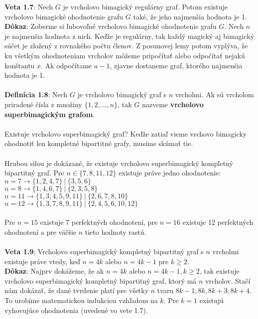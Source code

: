 \documentclass[12pt]{article}
\begin{document}
\textbf{Veta 1.7}: Nech $G$ je vrcholovo bimagický regulárny graf. Potom existuje vrcholovo bimagické ohodnotenie grafu $G$ také, že jeho najmenšia hodnota je 1. \\

\textbf{Dôkaz}: Zoberme si ľubovoľné vrcholovo bimagické ohodnotenie grafu $G$. Nech $n$ je najmenšia hodnota z nich. Keďže je regulárny, tak každý magický aj bimagický súčet je zložený z rovnakého počtu členov. Z posunovej lemy potom vyplýva, že ku všetkým ohodnoteniam vrcholov môžeme pripočítať alebo odpočítať nejakú konštantu $x$. Ak odpočítame $a-1$, zjavne dostaneme graf, ktorého najmenšia hodnota je 1. \\\\

\textbf{Definícia 1.8}: Nech $G$ je vrcholovo bimagický graf s $n$ vrcholmi. Ak sú vrcholom priradené čísla z množiny $\{1, 2, ... , n\}$, tak $G$ nazveme \textbf{ vrcholovo superbimagickým grafom}. \\\\

Existuje vrcholovo superbimagický graf? Keďže zatiaľ vieme vrchovo bimagicky ohodnotiť len kompletné bipartitné grafy, musíme skúmať tie. \\\\

Hrubou silou je dokázané, že existuje vrcholovo superbimagický kompletný bipartitný graf. Pre $n \in \{7, 8, 11, 12\}$ existuje práve jedno ohodnotenie: \\
$n = 7 \rightarrow \{1, 2, 4, 7\} ~|~ \{3, 5, 6\}$ \\
$n = 8 \rightarrow \{1, 4, 6, 7\} ~|~ \{2, 3, 5, 8\}$ \\
$n = 11 \rightarrow \{1, 3, 4, 5, 9, 11\} ~|~ \{2, 6, 7, 8, 10\}$ \\
$n = 12 \rightarrow \{1, 3, 7, 8, 9, 11\} ~|~ \{2, 4, 5, 6, 10, 12\}$ \\\\

Pre $n = 15$ existuje 7 perfektných ohodnotení, pre $n = 16$ existuje 12 perfektných ohodnotení a pre väčšie $n$ tieto hodnoty rastú. \\\\

\textbf{Veta 1.9}: Vrcholovo superbimagický kompletný bipartitný graf s $n$ vrcholmi existuje práve vtedy, keď $n = 4k$ alebo $n = 4k-1$ pre $k \geq 2$. \\

\textbf{Dôkaz}: Najprv dokážeme, že ak $n = 4k$ alebo $n = 4k-1, k \geq 2$, tak existuje vrcholovo superbimagický kompletný bipartitný graf, ktorý má $n$ vrcholov. Stačí nám dokázať, že dané tvrdenie platí pre všetky $n$ tvaru $8k-1, 8k, 8k+3, 8k+4$. To urobíme matematickou indukciou vzhľadom na $k$. Pre $k = 1$ existujú vyhovujúce ohodnotenia (uvedené vo vete 1.7). \\
\end{document}

